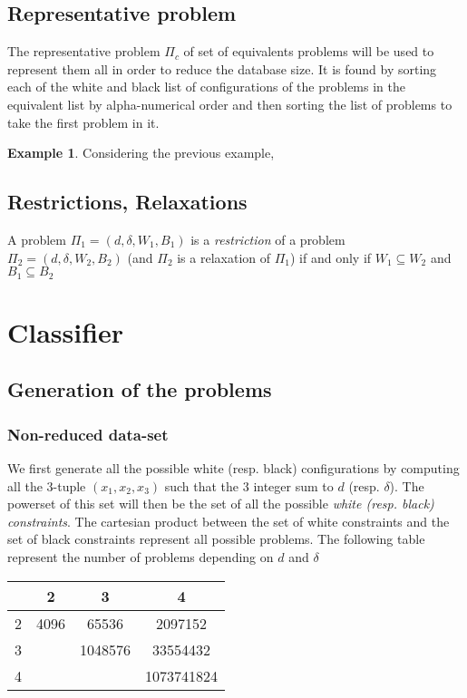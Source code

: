 \documentclass{article}
\theoremstyle{definition}
\newtheorem{exmp}{Example}[section]
\newcommand{\wdd}[0]{d}
\newcommand{\bdd}[0]{\delta}
\begin{document}
\subsection{Representative problem}
The representative problem $\Pi_c$ of set of equivalents problems will be used to represent them all in order to reduce the database size. It is found by sorting each of the white and black list of configurations of the problems in the equivalent list by alpha-numerical order and then sorting the list of problems to take the first problem in it.
\begin{exmp}
Considering the previous example,
\end{exmp}
\subsection{Restrictions, Relaxations}
A problem $\Pi_1 = (\wdd,\bdd,W_1,B_1)$ is a \textit{restriction} of a problem $\Pi_2 = (\wdd,\bdd,W_2,B_2)$ (and $\Pi_2$ is a relaxation of $\Pi_1$) if and only if $W_1\subseteq W_2$ and $B_1\subseteq B_2$
\section{Classifier}
\subsection{Generation of the problems}
\subsubsection{Non-reduced data-set}
We first generate all the possible white (resp. black) configurations by computing all the 3-tuple $(x_1,x_2, x_3)$ such that the 3 integer sum to $\wdd$ (resp. $\bdd$).
The powerset of this set will then be the set of all the possible \textit{white (resp. black) constraints}.
The cartesian product between the set of white constraints and the set of black constraints represent all possible problems. The following table represent the number of problems depending on $\wdd$ and $\bdd$
\begin{center}
\begin{tabular}{ | c | c | c | c |}
 \hline
 \diagbox{$\wdd$}{$\bdd$} & 2 & 3 & 4 \\ 
 \hline
 2 & 4096 & 65536 & 2097152\\
 \hline
 3 &  & 1048576 & 33554432\\
 \hline
 4 &  &  &  1073741824\\
\hline
\end{tabular}
\end{center}
\end{document}
